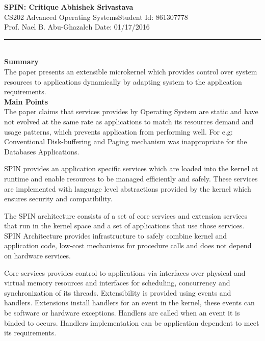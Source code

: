 \documentclass[a4paper, 10pt]{article}
\begin{document}
\noindent
\large\textbf{SPIN: Critique} \hfill \textbf{Abhishek Srivastava} \\
\normalsize CS202 Advanced Operating Systems\hfill Student Id: 861307778 \\
Prof. Nael B. Abu-Ghazaleh \hfill Date: 01/17/2016 \\
\hrule

\noindent
\\
\large\textbf{Summary}\\
The paper presents an extensible microkernel which provides control over system resources to applications dynamically by adapting system to the application requirements.\\

\noindent
\large\textbf{Main Points}\\
The paper claims that services provides by Operating System are static and have not evolved at the same rate as applications to match its resources demand and usage patterns, which prevents application from performing well. For e.g: Conventional Disk-buffering and Paging mechanism was inappropriate for the Databases Applications.

SPIN provides an application specific services which are loaded into the kernel at runtime and enable resources to be managed efficiently and safely. These services are implemented with language level abstractions provided by the kernel which ensures security and compatibility.


The SPIN architecture consists of a set of core services and extension services that run in the kernel space and a set of applications that use those services. SPIN Architecture provides infrastructure to safely combine kernel and application code, low-cost mechanisms for procedure calls and does not depend on hardware services. 

Core services provides control to applications via interfaces over physical and virtual memory resources and interfaces for scheduling, concurrency and synchronization of its threads. Extensibility is provided using events and handlers. Extensions install handlers for an event in the kernel, these events can be software or hardware exceptions. Handlers are called when an event it is binded to occurs. Handlers implementation can be application dependent to meet its requirements.
\end{document}
